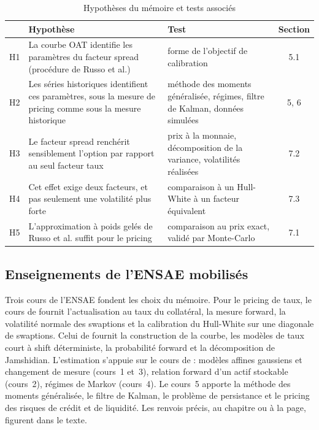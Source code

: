 \begin{table}[htbp]
\centering\small
\caption{Hypothèses du mémoire et tests associés}
\label{tab:hypotheses}
\begin{tabularx}{\textwidth}{@{}l X X c@{}}
\toprule
 & Hypothèse & Test & Section \\
\midrule
H1 & La courbe OAT identifie les paramètres du facteur spread (procédure de Russo et al.) & forme de l'objectif de calibration & 5.1 \\
H2 & Les séries historiques identifient ces paramètres, sous la mesure de pricing comme sous la mesure historique & méthode des moments généralisée, régimes, filtre de Kalman, données simulées & 5, 6 \\
H3 & Le facteur spread renchérit sensiblement l'option par rapport au seul facteur taux & prix à la monnaie, décomposition de la variance, volatilités réalisées & 7.2 \\
H4 & Cet effet exige deux facteurs, et pas seulement une volatilité plus forte & comparaison à un Hull-White à un facteur équivalent & 7.3 \\
H5 & L'approximation à poids gelés de Russo et al. suffit pour le pricing & comparaison au prix exact, validé par Monte-Carlo & 7.1 \\
\bottomrule
\end{tabularx}
\end{table}

\subsection*{Enseignements de l'ENSAE mobilisés}

Trois cours de l'ENSAE fondent les choix du mémoire. Pour le pricing de taux, le cours de \citet{Chaix2021}
fournit l'actualisation au taux du collatéral, la mesure forward, la volatilité normale des swaptions et la
calibration du Hull-White sur une diagonale de swaptions. Celui de \citet{Hillairet2026} fournit la construction
de la courbe, les modèles de taux court à shift déterministe, la probabilité forward et la décomposition de
Jamshidian. L'estimation s'appuie sur le cours de \citet{MPR2025} : modèles affines gaussiens et changement de
mesure (cours~1 et~3), relation forward d'un actif stockable (cours~2), régimes de Markov (cours~4). Le cours~5
apporte la méthode des moments généralisée, le filtre de Kalman, le problème de persistance et le pricing des
risques de crédit et de liquidité. Les renvois précis, au chapitre ou à la page, figurent dans le texte.

